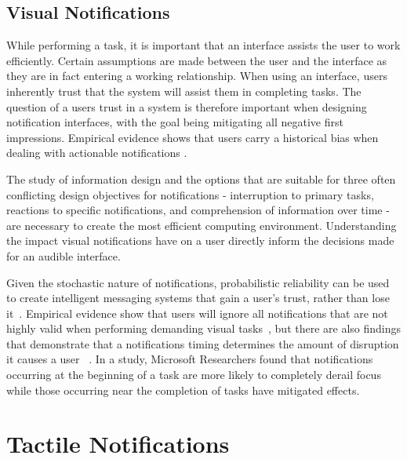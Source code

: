 \subsection{                  Visual Notifications                           }

While performing a task, it is important that an interface assists the user to
work efficiently. Certain assumptions are made between the user and the interface
as they are in fact entering a working relationship.  When using an interface,
users inherently trust that the system will assist them in completing tasks.
The question of a users trust in a system is therefore important when designing
notification interfaces, with the goal being mitigating all negative first
impressions.  Empirical evidence shows that users carry a historical bias when
dealing with actionable notifications \cite{leetiernan2001effective}.

The study of information design and the options that are suitable for three often
conflicting design objectives for notifications - interruption to primary tasks,
reactions to specific notifications, and comprehension of information over time
- are necessary to create the most efficient computing environment.
Understanding the impact visual notifications have on a user directly inform the
decisions made for an audible interface.

Given the stochastic nature of notifications, probabilistic reliability can be
used to create intelligent messaging systems that gain a user's trust, rather
than lose it~\cite{leetiernan2001effective}. Empirical evidence show that users
will ignore all notifications that are not highly valid when performing
demanding visual tasks~\cite{maltz2000cue}, but there are also findings that
demonstrate that a notifications timing determines the amount of disruption it
causes a user ~\cite{cutrell2001notification}.  In a study, Microsoft
Researchers found that notifications occurring at the beginning of a task are
more likely to completely derail focus while those occurring near the completion
of tasks have mitigated effects.

\section{                  Tactile Notifications                             }

